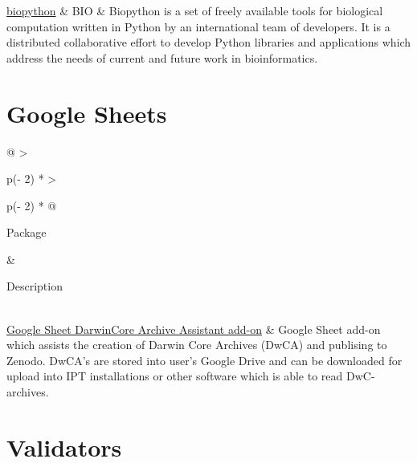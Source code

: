\documentclass[
]{book}
\begin{document}
\begin{longtable}[]
\href{https://biopython.org/}{biopython} & BIO & Biopython is a set of freely available tools for biological computation written in Python by an international team of developers. It is a distributed collaborative effort to develop Python libraries and applications which address the needs of current and future work in bioinformatics. \\
\bottomrule
\end{longtable}

\hypertarget{google-sheets}{%
\section{Google Sheets}\label{google-sheets}}

\begin{longtable}[]{@{}
  >{\raggedright\arraybackslash}p{(\columnwidth - 2\tabcolsep) * }
  >{\raggedright\arraybackslash}p{(\columnwidth - 2\tabcolsep) * }@{}}
\toprule
\begin{minipage}[b]{\linewidth}\raggedright
Package
\end{minipage} & \begin{minipage}[b]{\linewidth}\raggedright
Description
\end{minipage} \\
\midrule
\endhead
\href{https://dwcaassistant.com/}{Google Sheet DarwinCore Archive Assistant add-on} & Google Sheet add-on which assists the creation of Darwin Core Archives (DwCA) and publising to Zenodo. DwCA's are stored into user's Google Drive and can be downloaded for upload into IPT installations or other software which is able to read DwC-archives. \\
\bottomrule
\end{longtable}

\hypertarget{validators}{%
\section{Validators}\label{validators}}
\end{document}
